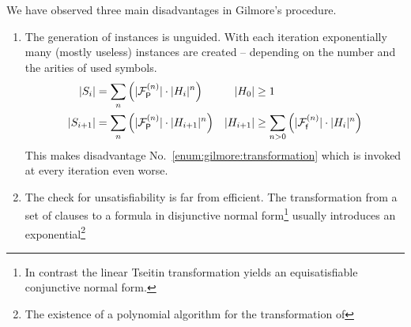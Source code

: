 We have observed three main disadvantages in Gilmore's procedure.
\begin{enumerate}
	\item\label{enum:gilmore:generation}
	The generation of instances is unguided.
	With each iteration exponentially many (mostly useless)
	instances are created
	-- depending on the number and the arities of used symbols.
	\begin{align*}
	\lvert S_{i} \rvert &= \sum_n \left( \lvert {\mathcal{F}^{(n)}_{\mathsf{P}}} \rvert\cdot \lvert H_{i}\rvert^n \right)
	&
	\lvert H_0 \rvert &\geq 1
	\\
	\lvert S_{i+1} \rvert &= \sum_n \left( \lvert {\mathcal{F}^{(n)}_{\mathsf{P}}} \rvert\cdot \lvert H_{i+1}\rvert^n \right)
	&
	\lvert H_{i+1}\rvert &\geq
	\sum_{n>0}\left(
	\lvert{\mathcal{F}^{(n)}_{\mathsf{f}}}\rvert\cdot\lvert H_i \rvert^n
	\right)
	\end{align*}
	This makes disadvantage No.~\ref{enum:gilmore:transformation}
	which is invoked at every iteration even worse.
	\item\label{enum:gilmore:transformation}
	The check for unsatisfiability is far from efficient.
	The transformation from a set of clauses
	to a formula in disjunctive normal form\footnote{
		In contrast the linear Tseitin transformation yields an equisatisfiable conjunctive normal form.
	}
	usually introduces an exponential\footnote{
		The existence of a polynomial algorithm
		for the transformation of
}
\end{enumerate}

